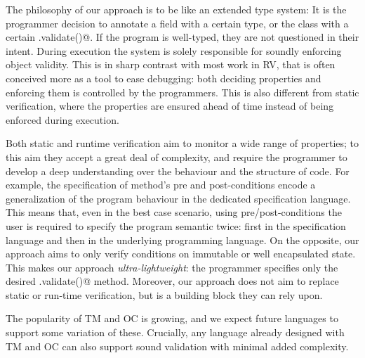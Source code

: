 
\loseSpace
The philosophy of our approach is to be like an extended type system: 
It is the programmer decision
to annotate a field with a certain type,
or the class with a certain \Q@.validate()@.
If the program is well-typed, they are not questioned in their intent.
During execution the system is solely responsible for soundly enforcing object validity.
This is in sharp contrast with most work in RV, that is often conceived more as a tool to ease debugging:
both deciding properties and enforcing them is controlled by the programmers.
This is also different from static verification,
where the properties are ensured ahead of time instead of being enforced during execution.

Both static and runtime verification
aim to monitor a wide range of properties; to this aim they accept a 
great deal of complexity, and require the programmer to develop a deep understanding
over the behaviour and the structure of code.
For example, the specification of method’s pre and post-conditions
encode a generalization of the program behaviour in the dedicated specification language.
This means that, even in the best case scenario, 
using pre/post-conditions the user is required to specify the program semantic twice:
first in the specification language and then in the underlying programming language.
On the opposite, our approach aims to only verify conditions on immutable or well encapsulated state.
This makes our approach \emph{ultra-lightweight}:
the programmer specifies only the desired \Q@.validate()@ method.
Moreover, our approach does not aim to replace static or run-time verification,
but is a building block they can rely upon.

The popularity of TM and OC is growing, and we expect future languages to support some variation of these.
Crucially, any language already designed with TM and OC
can also support sound validation with minimal added complexity.